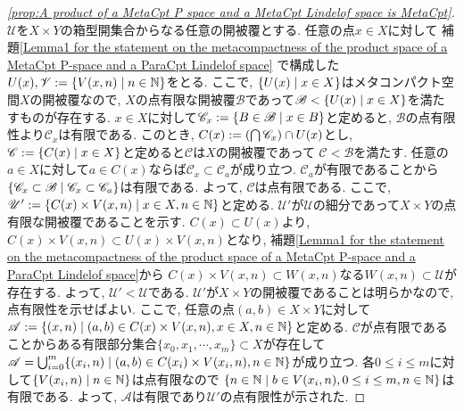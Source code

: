 \documentclass[uplatex, dvipdfmx, a4paper, 12pt, class=jsbook, crop=false]{standalone}
\begin{document}
\begin{proof}[\ref{prop:A product of a MetaCpt P space and a MetaCpt Lindelof space is MetaCpt}]
	$ \mathscr{U} $を$ X \times Y $の箱型開集合からなる任意の開被覆とする. 
	任意の点$ x \in X $に対して
	補題\ref{Lemma1 for the statement on the metacompactness of the product space of a MetaCpt P-space and a ParaCpt Lindelof space}
	で構成した$ U(x), \mathscr{V} \defeq \setcomp{V(x, n)}{n \in \N} $をとる. 
	ここで, $ \setcomp{U(x)}{x \in X} $はメタコンパクト空間$ X $の開被覆なので, 
	$ X $の点有限な開被覆$ \mathscr{B} $であって$ \mathscr{B} < \setcomp{U(x)}{x \in X} $を満たすものが存在する. 
	$ x \in X $に対して$ \mathscr{C}_x \defeq \setcomp{B \in \mathscr{B}}{x \in B} $と定めると, 
	$ \mathscr{B} $の点有限性より$ \mathscr{C}_x $は有限である. 
	このとき, $ C(x) \mathrel{:=} \left(\bigcap \mathscr{C}_x \right) \cap U(x) $とし, 
	$ \mathscr{C} \defeq \setcomp{C(x)}{x \in X} $と定めると$ \mathscr{C} $は$ X $の開被覆であって
	$ \mathscr{C} < \mathscr{B} $を満たす. 
	任意の$ a \in X $に対して$ a \in C(x) $ならば$ \mathscr{C}_x \subset \mathscr{C}_a $が成り立つ. 
	$ \mathscr{C}_a $が有限であることから
	$ \setcomp{\mathscr{C}_x \subset \mathscr{B}}{\mathscr{C}_x \subset \mathscr{C}_a} $は有限である. 
	よって, $ \mathscr{C} $は点有限である. 
	ここで, $ \mathscr{U}' \defeq \setcomp{C(x) \times V(x, n)}{x \in X, n \in \N} $と定める. 
	$ \mathscr{U}' $が$ \mathscr{U} $の細分であって$ X \times Y $の点有限な開被覆であることを示す. 
	$ C(x) \subset U(x) $より, $ C(x) \times V(x, n) \subset U(x) \times V(x, n)$となり, 
	補題\ref{Lemma1 for the statement on the metacompactness of the product space of a MetaCpt P-space and a ParaCpt Lindelof space}から
	$ C(x) \times V(x, n) \subset W(x, n) $なる$ W(x, n) \subset \mathscr{U} $が存在する. 
	よって, $ \mathscr{U}' < \mathscr{U} $である. 
	$ \mathscr{U}' $が$ X \times Y $の開被覆であることは明らかなので, 点有限性を示せばよい. 
	ここで, 任意の点$ (a, b) \in X \times Y $に対して
	$ \mathscr{A} \defeq \setcomp{(x, n)}{(a, b) \in C(x) \times V(x, n), x \in X, n \in \N} $と定める. 
	$ \mathscr{C} $が点有限であることからある有限部分集合$ \{x_0, x_1, \cdots, x_m\} \subset X $が存在して
	$ \mathscr{A} = \bigcup_{i=0}^{m} \setcomp{(x_i, n)}{(a, b) \in C(x_i) \times V(x_i, n), n \in \N} $が成り立つ. 
	各$ 0 \leq i \leq m$に対して$ \setcomp{V(x_i, n)}{n \in \N} $は点有限なので
	$ \setcomp{n \in \N}{b \in V(x_i, n), 0 \leq i \leq m, n \in \N} $は有限である. 
	よって, $ \mathscr{A} $は有限であり$ \mathscr{U}' $の点有限性が示された.
\end{proof}
\end{document}
